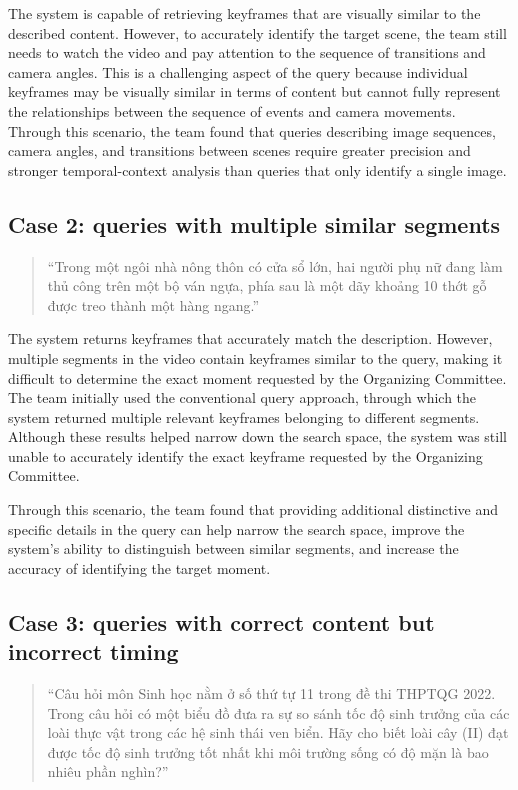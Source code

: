 \documentclass[11pt,a4paper]{article}
\begin{document}
The system is capable of retrieving keyframes that are visually similar to the described content. However, to accurately identify the target scene, the team still needs to watch the video and pay attention to the sequence of transitions and camera angles. This is a challenging aspect of the query because individual keyframes may be visually similar in terms of content but cannot fully represent the relationships between the sequence of events and camera movements. Through this scenario, the team found that queries describing image sequences, camera angles, and transitions between scenes require greater precision and stronger temporal-context analysis than queries that only identify a single image.

\subsection{Case 2: queries with multiple similar segments}

\begin{quote}
    ``Trong một ngôi nhà nông thôn có cửa sổ lớn, hai người phụ nữ đang làm thủ công trên một bộ ván ngựa, phía sau là một dãy khoảng 10 thớt gỗ được treo thành một hàng ngang.''
\end{quote}

The system returns keyframes that accurately match the description. However, multiple segments in the video contain keyframes similar to the query, making it difficult to determine the exact moment requested by the Organizing Committee. The team initially used the conventional query approach, through which the system returned multiple relevant keyframes belonging to different segments. Although these results helped narrow down the search space, the system was still unable to accurately identify the exact keyframe requested by the Organizing Committee.

Through this scenario, the team found that providing additional distinctive and specific details in the query can help narrow the search space, improve the system's ability to distinguish between similar segments, and increase the accuracy of identifying the target moment.

\subsection{Case 3: queries with correct content but incorrect timing}

\begin{quote}
    ``Câu hỏi môn Sinh học nằm ở số thứ tự 11 trong đề thi THPTQG 2022. Trong câu hỏi có một biểu đồ đưa ra sự so sánh tốc độ sinh trưởng của các loài thực vật trong các hệ sinh thái ven biển. Hãy cho biết loài cây (II) đạt được tốc độ sinh trưởng tốt nhất khi môi trường sống có độ mặn là bao nhiêu phần nghìn?''
\end{quote}
\end{document}
